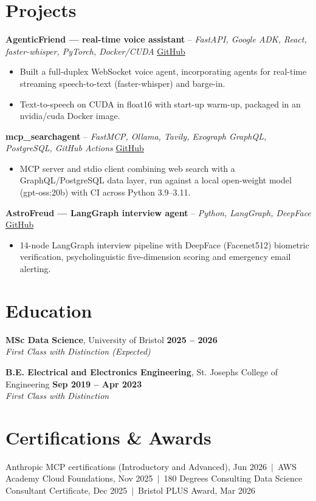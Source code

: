 \documentclass[a4paper,11pt]{article}
\begin{document}
\section{Projects}
\noindent\textbf{AgenticFriend — real-time voice assistant} -- \textit{FastAPI, Google ADK, React, faster-whisper, PyTorch, Docker/CUDA} \hfill \href{https://github.com/Thiruvel-AP/adk_multi-agent}{GitHub}
\begin{itemize}
  \item Built a full-duplex WebSocket voice agent, incorporating agents for real-time streaming speech-to-text (faster-whisper) and barge-in.
  \item Text-to-speech on CUDA in float16 with start-up warm-up, packaged in an nvidia/cuda Docker image.
\end{itemize}
\vspace{3pt}
\noindent\textbf{mcp\_searchagent} -- \textit{FastMCP, Ollama, Tavily, Exograph GraphQL, PostgreSQL, GitHub Actions} \hfill \href{https://github.com/Thiruvel-AP/mcp_searchagent}{GitHub}
\begin{itemize}
  \item MCP server and stdio client combining web search with a GraphQL/PostgreSQL data layer, run against a local open-weight model (gpt-oss:20b) with CI across Python 3.9–3.11.
\end{itemize}
\vspace{3pt}
\noindent\textbf{AstroFreud — LangGraph interview agent} -- \textit{Python, LangGraph, DeepFace} \hfill \href{https://github.com/Thiruvel-AP/AstroFreud}{GitHub}
\begin{itemize}
  \item 14-node LangGraph interview pipeline with DeepFace (Facenet512) biometric verification, psycholinguistic five-dimension scoring and emergency email alerting.
\end{itemize}

\section{Education}
\textbf{MSc Data Science}, University of Bristol \hfill \textbf{2025 – 2026}\\ \textit{First Class with Distinction (Expected)}\par
\vspace{3pt}
\textbf{B.E. Electrical and Electronics Engineering}, St. Joseph\textquotesingle{}s College of Engineering \hfill \textbf{Sep 2019 – Apr 2023}\\ \textit{First Class with Distinction}\par

\section{Certifications \& Awards}
Anthropic MCP certifications (Introductory and Advanced), Jun 2026 \,$|$\, AWS Academy Cloud Foundations, Nov 2025 \,$|$\, 180 Degrees Consulting Data Science Consultant Certificate, Dec 2025 \,$|$\, Bristol PLUS Award, Mar 2026
\end{document}
